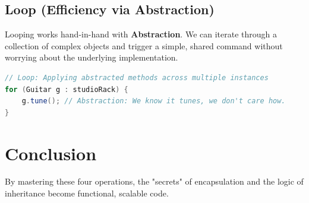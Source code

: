 \documentclass[12pt]{article}
\begin{document}
\subsection{Loop (Efficiency via Abstraction)}
Looping works hand-in-hand with \textbf{Abstraction}. We can iterate through a collection of complex objects and trigger a simple, shared command without worrying about the underlying implementation.
\begin{lstlisting}[language=Java]
// Loop: Applying abstracted methods across multiple instances
for (Guitar g : studioRack) {
    g.tune(); // Abstraction: We know it tunes, we don't care how.
}
\end{lstlisting}

\section{Conclusion}
By mastering these four operations, the "secrets" of encapsulation and the logic of inheritance become functional, scalable code.
\end{document}

